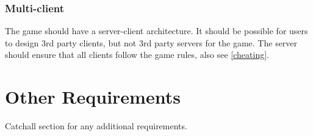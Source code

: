 \documentclass[a4paper,10pt]{article}
\begin{document}
\subsubsection{Multi-client}
The game should have a server-client architecture. It should be possible for users to design 3rd party clients, but not 3rd party servers for the game. The server should ensure that all clients follow the game rules, also see \ref{cheating}.

\section{Other Requirements}
Catchall section for any additional requirements.
\end{document}
